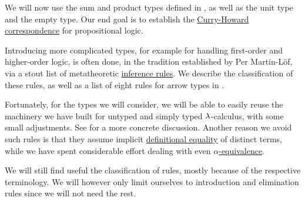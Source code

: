 \begin{remark}\label{rem:extended_simple_type_theory}
  We will now use the sum and product types defined in , as well as the unit type and the empty type. Our end goal is to establish the \hyperref[con:curry_howard_correspondence]{Curry-Howard correspondence} for propositional logic.

  Introducing more complicated types, for example for handling first-order and higher-order logic, is often done, in the tradition established by Per Martin-L\"of, via a stout list of metatheoretic \hyperref[def:inference_rule]{inference rules}. We describe the classification of these rules, as well as a list of eight rules for arrow types in .

  Fortunately, for the types we will consider, we will be able to easily reuse the machinery we have built for untyped and simply typed \( \mathrm{\lambda} \)-calculus, with some small adjustments. See  for a more concrete discussion. Another reason we avoid such rules is that they assume implicit \hyperref[con:equality]{definitional equality} of distinct terms, while we have spent considerable effort dealing with even \hyperref[def:lambda_term_alpha_equivalence]{\( \alpha \)-equivalence}.

  We will still find useful the classification of rules, mostly because of the respective terminology. We will however only limit ourselves to introduction and elimination rules since we will not need the rest.
\end{remark}

